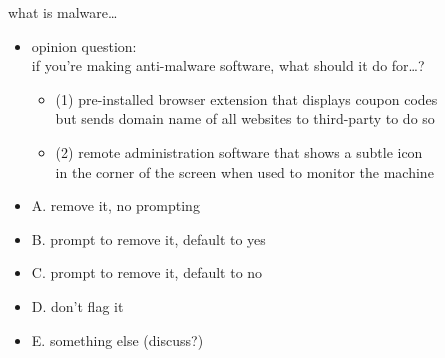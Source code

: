 \begin{frame}{what is malware\ldots}
\begin{itemize}
\item opinion question: \\
if you're making anti-malware software, what should it do for\ldots?
    \begin{itemize}
    \item (1) pre-installed browser extension that displays coupon codes \\
          but sends domain name of all websites to third-party to do so
          \vspace{.25cm}
    \item (2) remote administration software that shows a subtle icon \\
          in the corner of the screen when used to monitor the machine
    \end{itemize}
\vspace{.5cm}
\item A. remove it, no prompting
\item B. prompt to remove it, default to yes
\item C. prompt to remove it, default to no
\item D. don't flag it
\item E. something else (discuss?)
\end{itemize}
\end{frame}
